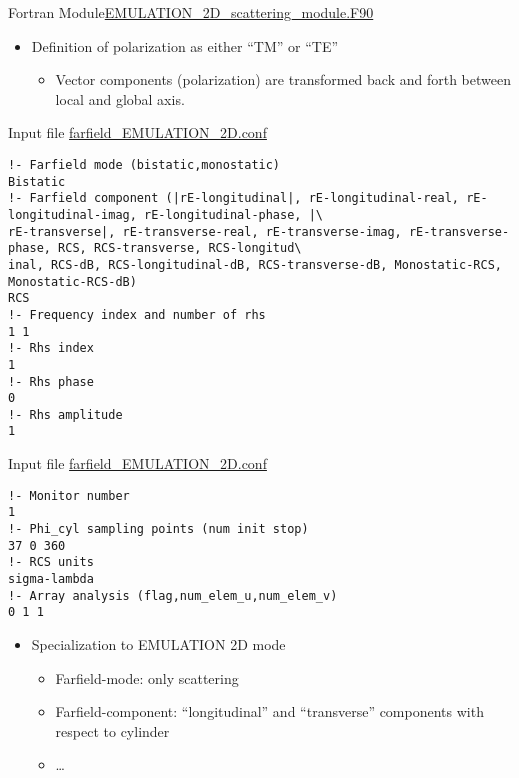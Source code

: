 \begin{frame}{Fortran Module}{\url{EMULATION_2D_scattering_module.F90} }
\begin{itemize}
   \item Definition of polarization as either ``TM'' or ``TE''
     \begin{itemize}
     \item Vector components (polarization) are transformed back and
       forth between local and global axis.
     \end{itemize}

   \end{itemize}

   \framebreak %


   \begin{block}{Input file \url{farfield_EMULATION_2D.conf}} 
      \begin{lstlisting}[basicstyle=\ttfamily\footnotesize,tabsize=3,frame=none]
!- Farfield mode (bistatic,monostatic)
Bistatic
!- Farfield component (|rE-longitudinal|, rE-longitudinal-real, rE-longitudinal-imag, rE-longitudinal-phase, |\
rE-transverse|, rE-transverse-real, rE-transverse-imag, rE-transverse-phase, RCS, RCS-transverse, RCS-longitud\
inal, RCS-dB, RCS-longitudinal-dB, RCS-transverse-dB, Monostatic-RCS, Monostatic-RCS-dB)
RCS
!- Frequency index and number of rhs
1 1
!- Rhs index
1
!- Rhs phase
0
!- Rhs amplitude
1
     \end{lstlisting}
   \end{block}

   \framebreak %


   \begin{block}{Input file \url{farfield_EMULATION_2D.conf}} 
      \begin{lstlisting}[basicstyle=\ttfamily\footnotesize,tabsize=3,frame=none]
!- Monitor number
1
!- Phi_cyl sampling points (num init stop)
37 0 360
!- RCS units                             
sigma-lambda
!- Array analysis (flag,num_elem_u,num_elem_v) 
0 1 1                                                                            
     \end{lstlisting}
   \end{block}

   \framebreak %
   
   \begin{itemize}
   \item Specialization to EMULATION 2D mode
     \begin{itemize}
     \item Farfield-mode: only scattering %
     \item Farfield-component: ``longitudinal'' and ``transverse''
       components with respect to cylinder
     \item \ldots
     \end{itemize}
     

\end{itemize}
\end{frame}
